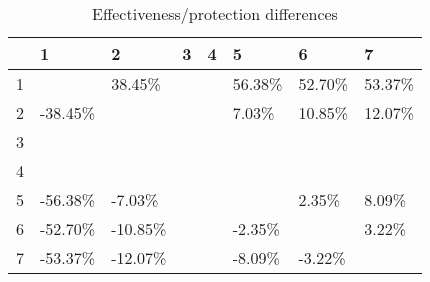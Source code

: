 \begin{table}[ht]
\centering
\begin{tabular}{rlllllll}
  \hline
 & 1 & 2 & 3 & 4 & 5 & 6 & 7 \\ 
  \hline
1 &  & 38.45\% &  &  & 56.38\% & 52.70\% & 53.37\% \\ 
  2 & -38.45\% &  &  &  & 7.03\% & 10.85\% & 12.07\% \\ 
  3 &  &  &  &  &  &  &  \\ 
  4 &  &  &  &  &  &  &  \\ 
  5 & -56.38\% & -7.03\% &  &  &  & 2.35\% & 8.09\% \\ 
  6 & -52.70\% & -10.85\% &  &  & -2.35\% &  & 3.22\% \\ 
  7 & -53.37\% & -12.07\% &  &  & -8.09\% & -3.22\% &  \\ 
   \hline
\end{tabular}
\caption{Effectiveness/protection differences} 
\end{table}
